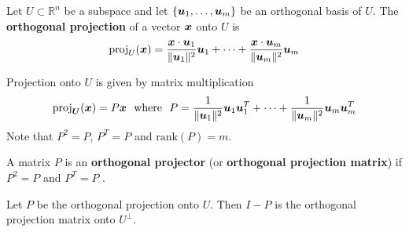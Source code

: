 \begin{definition}
Let $U \subset \mathbb{R}^n$ be a subspace and let $\{ \boldsymbol{u}_1, \dots, \boldsymbol{u}_m \}$ be an orthogonal basis of $U$. The {\bf orthogonal projection} \cite[p.420]{KN} of a vector $\boldsymbol{x}$ onto $U$ is
$$
\mathrm{proj}_U(\boldsymbol{x}) = \frac{\boldsymbol{x} \cdot \boldsymbol{u}_1}{\| \boldsymbol{u}_1 \|^2} \boldsymbol{u}_1 + \cdots + \frac{\boldsymbol{x} \cdot \boldsymbol{u}_m}{\| \boldsymbol{u}_m \|^2} \boldsymbol{u}_m
$$
\end{definition}

\begin{note}
Projection onto $U$ is given by matrix multiplication
$$
\mathrm{proj}_{\boldsymbol{U}}(\boldsymbol{x}) = P \boldsymbol{x}
\ \ \text{where} \ \
P = \frac{1}{\| \boldsymbol{u}_1 \|^2} \boldsymbol{u}_1 \boldsymbol{u}_1^T + \cdots + \frac{1}{\| \boldsymbol{u}_m \|^2} \boldsymbol{u}_m \boldsymbol{u}_m^T
$$
Note that $P^2 = P$, $P^T = P$ and $\mathrm{rank}(P) = m$.
\end{note}

\begin{definition}
A matrix $P$ is an {\bf orthogonal projector} (or {\bf orthogonal projection matrix}) if $P^2 = P$ and $P^T = P$ \cite[p.110]{MH}.
\end{definition}

\begin{proposition}
Let $P$ be the orthogonal projection onto $U$. Then $I - P$ is the orthogonal projection matrix onto $U^{\perp}$. 
\end{proposition}

